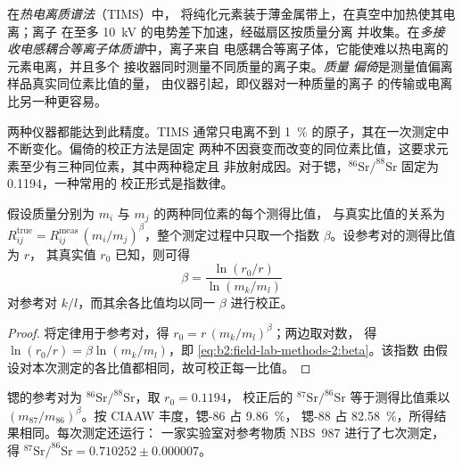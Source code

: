 \begin{definition}\label{def:b2:field-lab-methods-2:tims}
在\emph{热电离质谱法}（TIMS）中，
将纯化元素装于薄金属带上，在真空中加热使其电离；离子
在至多 \qty{10}{kV} 的电势差下加速，经磁扇区按质量分离
并收集。在\emph{多接收电感耦合等离子体质谱}中，离子来自
电感耦合等离子体，它能使难以热电离的元素电离，并且多个
接收器同时测量不同质量的离子束。\emph{质量
偏倚}是测量值偏离样品真实同位素比值的量，
由仪器引起，即仪器对一种质量的离子
的传输或电离比另一种更容易。
\end{definition}

两种仪器都能达到此精度。TIMS 通常只电离不到
\qty{1}{\percent} 的原子，其在一次测定中不断变化。偏倚的校正方法是固定
两种不因衰变而改变的同位素比值，这要求元素至少有三种同位素，其中两种稳定且
非放射成因。对于锶，$^{86}\mathrm{Sr}/^{88}\mathrm{Sr}$ 固定为 0.1194，一种常用的
校正形式是指数律。

\begin{proposition}[质量偏倚的指数律]\label{prop:b2:field-lab-methods-2:bias}
假设质量分别为 $m_i$ 与 $m_j$ 的两种同位素的每个测得比值，
与真实比值的关系为 $R_{ij}^{\mathrm{true}} = R_{ij}^{\mathrm{meas}}\,(m_i/m_j)^{\beta}$，整个测定过程中只取一个指数
$\beta$。设参考对的测得比值为 $r$，
其真实值 $r_0$ 已知，则可得
\begin{equation}
\beta = \frac{\ln(r_0/r)}{\ln(m_k/m_l)}
\label{eq:b2:field-lab-methods-2:beta}
\end{equation}
对参考对 $k/l$，而其余各比值均以同一 $\beta$ 进行校正。
\end{proposition}

\begin{proof}
将定律用于参考对，得 $r_0 = r\,(m_k/m_l)^\beta$；两边取对数，
得 $\ln(r_0/r) = \beta\ln(m_k/m_l)$，即 \eqref{eq:b2:field-lab-methods-2:beta}。该指数
由假设对本次测定的各比值都相同，故可校正每一比值。
\end{proof}

锶的参考对为 $^{86}\mathrm{Sr}/^{88}\mathrm{Sr}$，取 $r_0 = 0.1194$，
校正后的 $^{87}\mathrm{Sr}/^{86}\mathrm{Sr}$ 等于测得比值乘以
$(m_{87}/m_{86})^\beta$。按 CIAAW 丰度，锶-86 占 \qty{9.86}{\percent}，
锶-88 占 \qty{82.58}{\percent}，所得结果相同。每次测定还运行：
一家实验室对参考物质 NBS~987 进行了七次测定，得 $^{87}\mathrm{Sr}/^{86}\mathrm{Sr} = 0.710252 \pm
0.000007$。

